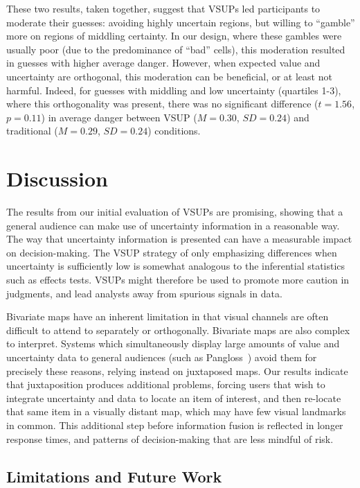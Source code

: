 These two results, taken together, suggest that VSUPs led participants to moderate their guesses: avoiding highly uncertain regions, but willing to ``gamble'' more on regions of middling certainty. In our design, where these gambles were usually poor (due to the predominance of ``bad'' cells), this moderation resulted in guesses with higher average danger. However, when expected value and uncertainty are orthogonal, this moderation can be beneficial, or at least not harmful. Indeed, for guesses with middling and low uncertainty (quartiles 1-3), where this orthogonality was present, there was no significant difference ($t=1.56$, $p=0.11$) in average danger between VSUP ($M=0.30$, $SD=0.24$) and traditional ($M=0.29$, $SD=0.24$) conditions. 

\section{Discussion}

\sizeFig

The results from our initial evaluation of VSUPs are promising, showing that a general audience can make use of uncertainty information in a reasonable way. The way that uncertainty information is presented can have a measurable impact on decision-making. The VSUP strategy of only emphasizing differences when uncertainty is sufficiently low is somewhat analogous to the inferential statistics such as effects tests. VSUPs might therefore be used to promote more caution in judgments, and lead analysts away from spurious signals in data.

Bivariate maps have an inherent limitation in that visual channels are often difficult to attend to separately or orthogonally. Bivariate maps are also complex to interpret. Systems which simultaneously display large amounts of value and uncertainty data to general audiences (such as Pangloss~\cite{moritz2017trust}) avoid them for precisely these reasons, relying instead on juxtaposed maps. Our results indicate that juxtaposition produces additional problems, forcing users that wish to integrate uncertainty and data to locate an item of interest, and then re-locate that same item in a visually distant map, which may have few visual landmarks in common. This additional step before information fusion is reflected in longer response times, and patterns of decision-making that are less mindful of risk.

\subsection{Limitations and Future Work}

